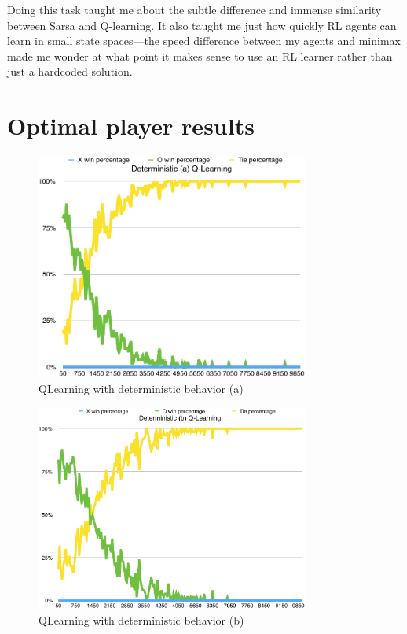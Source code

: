 \documentclass{journal}
\begin{document}
Doing this task taught me about the subtle difference and immense similarity
between Sarsa and Q-learning. It also taught me just how quickly RL agents
can learn in small state spaces---the speed difference between my agents and
minimax made me wonder at what point it makes sense to use an RL learner rather
than just a hardcoded solution.


\clearpage{}
\appendix
\section{Optimal player results}\label{app:optimal}
\begin{figure}[h]
	\includegraphics[width=0.8\textwidth]{QLearningD(a).pdf}
	\caption{QLearning with deterministic behavior (a)}\label{fig:QDA}
\end{figure}
\begin{figure}[h]
	\includegraphics[width=0.8\textwidth]{QLearningD(b).pdf}
	\caption{QLearning with deterministic behavior (b)}\label{fig:QDB}
\end{figure}
\end{document}
